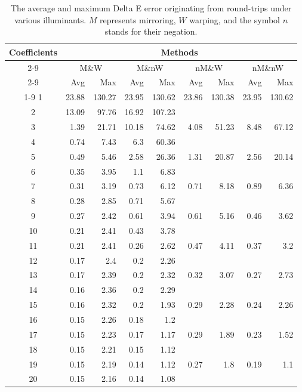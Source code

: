 \begin{table}[t]
	\centering
	\begin{tabular}{crrrrrrrr}
		\toprule
		\multirow{4}{*}{Coefficients} &
		\multicolumn{8}{c}{Methods} \\
		\cmidrule(lr){2-9}
		&\multicolumn{2}{c}{M\&W} &
		\multicolumn{2}{c}{M\&nW} &
		\multicolumn{2}{c}{nM\&W} &
		\multicolumn{2}{c}{nM\&nW}\\
		\cmidrule(lr){2-9}
		& Avg & Max & Avg & Max & Avg & Max & Avg & Max \\
		\cmidrule(lr){1-9}
		1&23.88&130.27&23.95&130.62&23.86&130.38&23.95&130.62\\
		2&13.09&97.76&16.92&107.23&\textemdash&\textemdash&\textemdash&\textemdash\\
		3&1.39&21.71&10.18&74.62&4.08&51.23&8.48&67.12\\
		4&0.74&7.43&6.3&60.36&\textemdash&\textemdash&\textemdash&\textemdash\\
		5&0.49&5.46&2.58&26.36&1.31&20.87&2.56&20.14\\
		6&0.35&3.95&1.1&6.83&\textemdash&\textemdash&\textemdash&\textemdash\\
		7&0.31&3.19&0.73&6.12&0.71&8.18&0.89&6.36\\
		8&0.28&2.85&0.71&5.67&\textemdash&\textemdash&\textemdash&\textemdash\\
		9&0.27&2.42&0.61&3.94&0.61&5.16&0.46&3.62\\
		10&0.21&2.41&0.43&3.78&\textemdash&\textemdash&\textemdash&\textemdash\\
		11&0.21&2.41&0.26&2.62&0.47&4.11&0.37&3.2\\
		12&0.17&2.4&0.2&2.26&\textemdash&\textemdash&\textemdash&\textemdash\\
		13&0.17&2.39&0.2&2.32&0.32&3.07&0.27&2.73\\
		14&0.16&2.36&0.2&2.29&\textemdash&\textemdash&\textemdash&\textemdash\\
		15&0.16&2.32&0.2&1.93&0.29&2.28&0.24&2.26\\
		16&0.15&2.26&0.18&1.2&\textemdash&\textemdash&\textemdash&\textemdash\\
		17&0.15&2.23&0.17&1.17&0.29&1.89&0.23&1.52\\
		18&0.15&2.21&0.15&1.12&\textemdash&\textemdash&\textemdash&\textemdash\\
		19&0.15&2.19&0.14&1.12&0.27&1.8&0.19&1.1\\
		20&0.15&2.16&0.14&1.08&\textemdash&\textemdash&\textemdash&\textemdash\\
		\bottomrule
	\end{tabular}
	\caption{The average and maximum Delta E error originating from round-trips under various illuminants. $M$ represents mirroring, $W$ warping, and the symbol $n$ stands for their negation.}
	\label{table:comparisonMomentTechnique}
\end{table}

